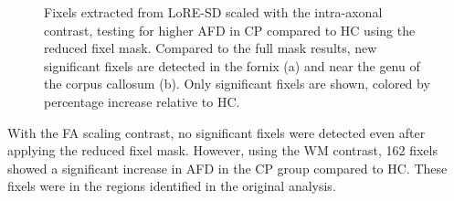 \begin{figure}[H]
    \centering
    \hfill
    \caption{Fixels extracted from LoRE-SD scaled with the intra-axonal contrast, testing for higher AFD in CP compared to HC using the reduced fixel mask. Compared to the full mask results, new significant fixels are detected in the fornix (a) and near the genu of the corpus callosum (b). Only significant fixels are shown, colored by percentage increase relative to HC.}
    \label{fig:reduced_intra}
\end{figure}


With the FA scaling contrast, no significant fixels were detected even after applying the reduced fixel mask.
However, using the WM contrast, 162 fixels showed a significant increase in AFD in the CP group compared to HC. These fixels were in the regions identified in the original analysis.


